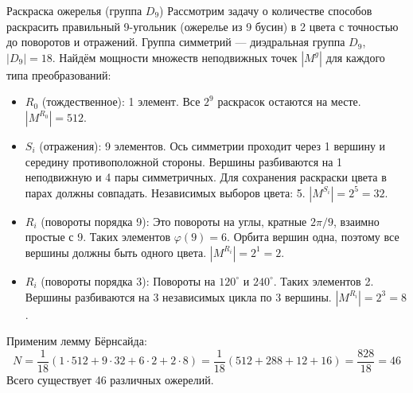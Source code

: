 \begin{Example}{Раскраска ожерелья (группа $D_9$)}{}
	Рассмотрим задачу о количестве способов раскрасить правильный 9-угольник (ожерелье из 9 бусин) в 2 цвета с точностью до поворотов и отражений.
	Группа симметрий — диэдральная группа $D_9$, $|D_9| = 18$.
	Найдём мощности множеств неподвижных точек $|M^g|$ для каждого типа преобразований:
	\begin{itemize}
		\item $R_0$ (тождественное): 1 элемент.
		Все $2^9$ раскрасок остаются на месте. $|M^{R_0}| = 512$.
		\item $S_i$ (отражения): 9 элементов.
		Ось симметрии проходит через 1 вершину и середину противоположной стороны. Вершины разбиваются на 1 неподвижную и 4 пары симметричных.
		Для сохранения раскраски цвета в парах должны совпадать. Независимых выборов цвета: 5. $|M^{S_i}| = 2^5 = 32$.
		\item $R_i$ (повороты порядка 9): Это повороты на углы, кратные $2\pi/9$, взаимно простые с 9. Таких элементов $\varphi(9) = 6$.
		Орбита вершин одна, поэтому все вершины должны быть одного цвета. $|M^{R_i}| = 2^1 = 2$.
		\item $R_i$ (повороты порядка 3): Повороты на $120^\circ$ и $240^\circ$.
		Таких элементов 2. Вершины разбиваются на 3 независимых цикла по 3 вершины. $|M^{R_i}| = 2^3 = 8$.
	\end{itemize}
	Применим лемму Бёрнсайда:
	\[ N = \frac{1}{18} (1 \cdot 512 + 9 \cdot 32 + 6 \cdot 2 + 2 \cdot 8) = \frac{1}{18} (512 + 288 + 12 + 16) = \frac{828}{18} = 46 \] 
	Всего существует 46 различных ожерелий.
\end{Example}

